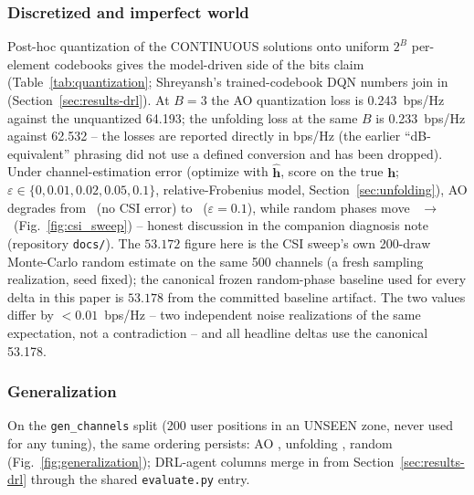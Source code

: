 \subsubsection{Discretized and imperfect world}
Post-hoc quantization of the CONTINUOUS solutions onto uniform $2^B$ per-element
codebooks gives the model-driven side of the bits claim
(Table~\ref{tab:quantization}; Shreyansh's trained-codebook DQN numbers join in
(Section~\ref{sec:results-drl}). At $B=3$ the AO quantization loss is
0.243~bps/Hz against the unquantized 64.193; the unfolding loss at the same
$B$ is 0.233~bps/Hz against 62.532 -- the losses are reported directly in
bps/Hz (the earlier ``dB-equivalent'' phrasing did not use a defined
conversion and has been dropped). Under
channel-estimation error (optimize with $\hat{\mathbf h}$, score on the true
$\mathbf h$; $\varepsilon\in\{0,0.01,0.02,0.05,0.1\}$, relative-Frobenius
model, Section~\ref{sec:unfolding}), AO degrades from
\CsiAoZero\ (no CSI error) to \CsiAoPone\ ($\varepsilon = 0.1$), while random
phases move \CsiRandomZero\ $\to$ \CsiRandomPone\
(Fig.~\ref{fig:csi_sweep}) -- honest discussion in
the companion diagnosis note (repository \texttt{docs/}).
The $53.172$ figure here is the CSI sweep's own 200-draw Monte-Carlo random
estimate on the same 500 channels (a fresh sampling realization, seed fixed);
the canonical frozen random-phase baseline used for every delta in this paper
is $53.178$ from the committed baseline artifact. The two values differ by
$<0.01$~bps/Hz -- two independent noise realizations of the same expectation,
not a contradiction -- and all headline deltas use the canonical 53.178.

\subsubsection{Generalization}
On the \texttt{gen\_channels} split (200 user positions in an UNSEEN zone,
never used for any tuning), the same ordering persists:
AO \GenAo, unfolding \GenUnfold, random \GenRandom
(Fig.~\ref{fig:generalization}); DRL-agent columns merge in from
Section~\ref{sec:results-drl} through the shared \texttt{evaluate.py} entry.

